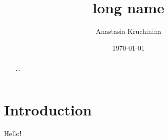 \documentclass{amsart}
\title[short name]{long name}
\author{Anastasia Kruchinina}
\date{\today}
\begin{document}
\begin{abstract}
...
\end{abstract}
\maketitle

\tableofcontents


\section{Introduction}


Hello!~\cite{Label}

\end{document}
